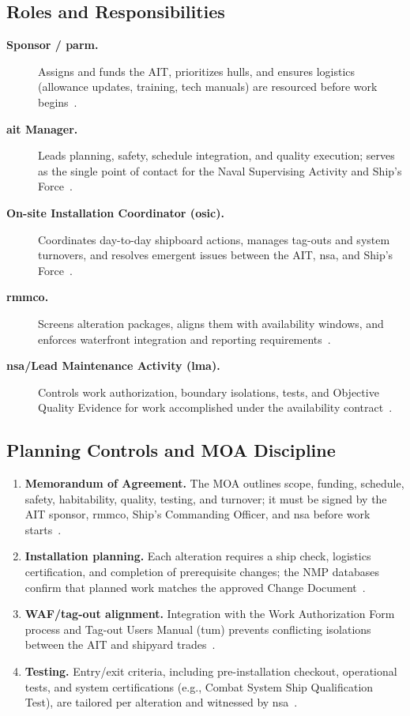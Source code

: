 \documentclass[../main.tex]{subfiles}
\begin{document}
\subsection{Roles and Responsibilities}
\begin{description}
\item[\textbf{Sponsor / \ac{parm}.}] Assigns and funds the AIT, prioritizes hulls, and ensures logistics (allowance updates, training, tech manuals) are resourced before work begins~\autocite{SL720-AA-MAN-030}.
\item[\textbf{\ac{ait} Manager.}] Leads planning, safety, schedule integration, and quality execution; serves as the single point of contact for the Naval Supervising Activity and Ship's Force~\autocite{TS9090-310}.
\item[\textbf{On-site Installation Coordinator (\ac{osic}).}] Coordinates day-to-day shipboard actions, manages tag-outs and system turnovers, and resolves emergent issues between the AIT, \ac{nsa}, and Ship's Force~\autocite{edo-4-1-4-ait-fundamentals-2025}.
\item[\textbf{\ac{rmmco}.}] Screens alteration packages, aligns them with availability windows, and enforces waterfront integration and reporting requirements~\autocite{TS9090-310}.
\item[\textbf{\ac{nsa}/Lead Maintenance Activity (\ac{lma}).}] Controls work authorization, boundary isolations, tests, and Objective Quality Evidence for work accomplished under the availability contract~\autocite{COMFLTFORCOMINST4790-3}.
\end{description}

\subsection{Planning Controls and MOA Discipline}
\begin{enumerate}
\item \textbf{Memorandum of Agreement.} The MOA outlines scope, funding, schedule, safety, habitability, quality, testing, and turnover; it must be signed by the AIT sponsor, \ac{rmmco}, Ship's Commanding Officer, and \ac{nsa} before work starts~\autocite{TS9090-310}.
\item \textbf{Installation planning.} Each alteration requires a ship check, logistics certification, and completion of prerequisite changes; the NMP databases confirm that planned work matches the approved Change Document~\autocite{SL720-AA-MAN-030}.
\item \textbf{WAF/tag-out alignment.} Integration with the Work Authorization Form process and Tag-out Users Manual (\ac{tum}) prevents conflicting isolations between the AIT and shipyard trades~\autocite{S0400-AD-URM-010}.
\item \textbf{Testing.} Entry/exit criteria, including pre-installation checkout, operational tests, and system certifications (e.g., Combat System Ship Qualification Test), are tailored per alteration and witnessed by \ac{nsa}~\autocite{TS9090-310}.
\end{enumerate}
\end{document}
